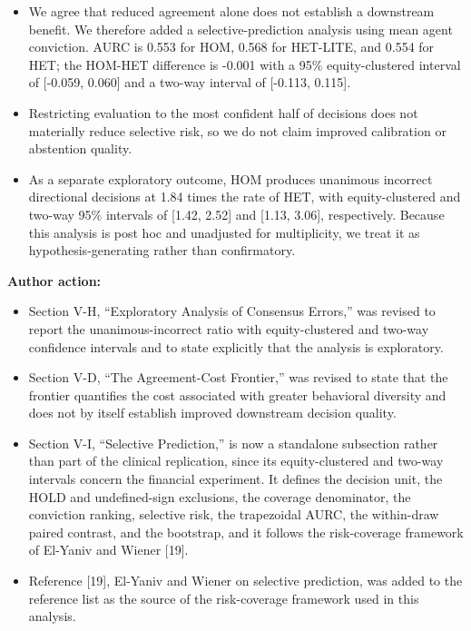 \documentclass[11pt]{article}
\begin{document}
\begin{itemize}

\item We agree that reduced agreement alone does not establish a downstream benefit. We therefore added a selective-prediction analysis using mean agent conviction. AURC is 0.553 for HOM, 0.568 for HET-LITE, and 0.554 for HET; the HOM-HET difference is -0.001 with a 95\% equity-clustered interval of [-0.059, 0.060] and a two-way interval of [-0.113, 0.115].

\item Restricting evaluation to the most confident half of decisions does not materially reduce selective risk, so we do not claim improved calibration or abstention quality.

\item As a separate exploratory outcome, HOM produces unanimous incorrect directional decisions at 1.84 times the rate of HET, with equity-clustered and two-way 95\% intervals of [1.42, 2.52] and [1.13, 3.06], respectively. Because this analysis is post hoc and unadjusted for multiplicity, we treat it as hypothesis-generating rather than confirmatory.

\end{itemize}

\textbf{Author action:}

\begin{itemize}

\item Section V-H, ``Exploratory Analysis of Consensus Errors,'' was revised to report the unanimous-incorrect ratio with equity-clustered and two-way confidence intervals and to state explicitly that the analysis is exploratory.

\item Section V-D, ``The Agreement-Cost Frontier,'' was revised to state that the frontier quantifies the cost associated with greater behavioral diversity and does not by itself establish improved downstream decision quality.

\item Section V-I, ``Selective Prediction,'' is now a standalone subsection rather than part of the clinical replication, since its equity-clustered and two-way intervals concern the financial experiment. It defines the decision unit, the HOLD and undefined-sign exclusions, the coverage denominator, the conviction ranking, selective risk, the trapezoidal AURC, the within-draw paired contrast, and the bootstrap, and it follows the risk-coverage framework of El-Yaniv and Wiener [19].

\item Reference [19], El-Yaniv and Wiener on selective prediction, was added to the reference list as the source of the risk-coverage framework used in this analysis.

\end{itemize}
\end{document}
